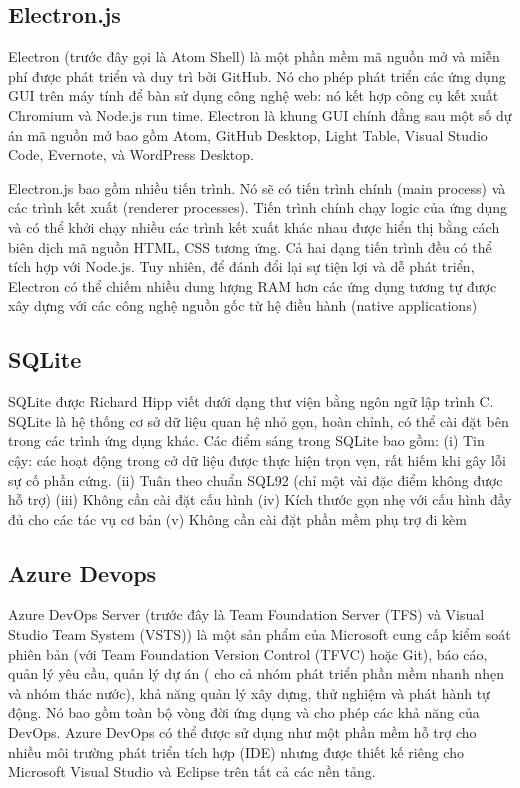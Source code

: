 \documentclass[12pt]{report}
\begin{document}
\subsection{Electron.js}
Electron (trước đây gọi là Atom Shell) là một phần mềm mã nguồn mở và miễn phí được phát triển và duy trì bởi GitHub. Nó cho phép phát triển các ứng dụng GUI trên máy tính để bàn sử dụng công nghệ web: nó kết hợp công cụ kết xuất Chromium và Node.js run time. Electron là khung GUI chính đằng sau một số dự án mã nguồn mở bao gồm Atom, GitHub Desktop, Light Table, Visual Studio Code, Evernote, và WordPress Desktop.

Electron.js bao gồm nhiều tiến trình. Nó sẽ có tiến trình chính (main process) và các trình kết xuất (renderer processes). Tiến trình chính chạy logic của ứng dụng và có thể khởi chạy nhiều các trình kết xuất khác nhau được hiển thị bằng cách biên dịch mã nguồn HTML, CSS tương ứng. Cả hai dạng tiến trình đều có thể tích hợp với Node.js.
Tuy nhiên, để đánh đổi lại sự tiện lợi và dễ phát triển, Electron có thể chiếm nhiều dung lượng RAM hơn các ứng dụng tương tự được xây dựng với các công nghệ nguồn gốc từ hệ điều hành (native applications)
\subsection{SQLite}
SQLite được Richard Hipp viết dưới dạng thư viện bằng ngôn ngữ lập trình C. SQLite là hệ thống cơ sở dữ liệu quan hệ nhỏ gọn, hoàn chỉnh, có thể cài đặt bên trong các trình ứng dụng khác. Các điểm sáng trong SQLite bao gồm: (i) Tin cậy: các hoạt động trong cở dữ liệu được thực hiện trọn vẹn, rất hiếm khi gây lỗi sự cố phần cứng. (ii) Tuân theo chuẩn SQL92 (chỉ một vài đặc điểm không được hỗ trợ) (iii) Không cần cài đặt cấu hình (iv) Kích thước gọn nhẹ với cấu hình đầy đủ cho các tác vụ cơ bản (v) Không cần cài đặt phần mềm phụ trợ đi kèm
\subsection{Azure Devops}
Azure DevOps Server (trước đây là Team Foundation Server (TFS) và Visual Studio Team System (VSTS)) là một sản phẩm của Microsoft cung cấp kiểm soát phiên bản (với Team Foundation Version Control (TFVC) hoặc Git), báo cáo, quản lý yêu cầu, quản lý dự án ( cho cả nhóm phát triển phần mềm nhanh nhẹn và nhóm thác nước), khả năng quản lý xây dựng, thử nghiệm và phát hành tự động. Nó bao gồm toàn bộ vòng đời ứng dụng và cho phép các khả năng của DevOps. Azure DevOps có thể được sử dụng như một phần mềm hỗ trợ cho nhiều môi trường phát triển tích hợp (IDE) nhưng được thiết kế riêng cho Microsoft Visual Studio và Eclipse trên tất cả các nền tảng. 
\end{document}
